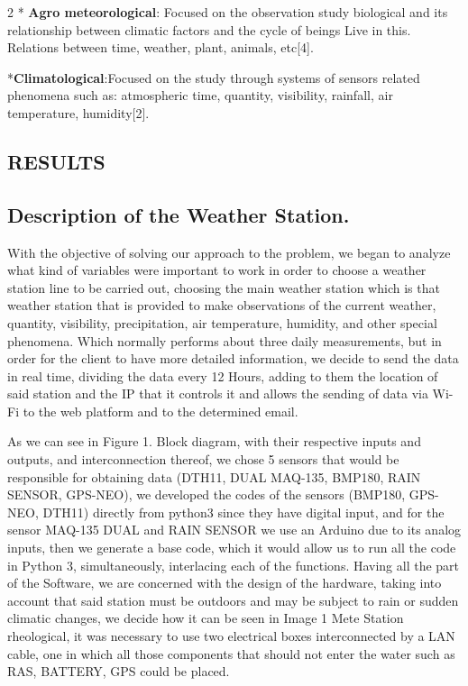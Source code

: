 \documentclass{article}
\begin{document}
\begin{multicols} {2}
* \textbf{Agro meteorological}: Focused on the observation study
biological and its relationship between climatic factors and the cycle of beings Live in this. Relations between time, weather, plant, animals, etc[4].

*\textbf{Climatological}:Focused on the study through systems of
sensors related phenomena such as: atmospheric time, quantity,
visibility, rainfall, air temperature, humidity[2].


\begin{center}
\section{RESULTS} 
\end{center}
\subsection{Description of the Weather Station.}

With the objective of solving our approach to the problem, we began to analyze what kind of variables were important to work in order to choose a weather station line to be carried out, choosing the main weather station which is that weather station that is provided to make observations of the current weather, quantity, visibility, precipitation, air temperature, humidity, and other special phenomena. Which normally performs about three daily measurements, but in order for the client to have more detailed information, we decide to send the data in real time, dividing the data every 12 Hours, adding to them the location of said station and the IP that it controls it and allows the sending of data via Wi-Fi to the web platform and to the determined email.

As we can see in Figure 1. Block diagram, with their respective inputs and outputs, and interconnection thereof, we chose 5 sensors that would be responsible for obtaining data (DTH11, DUAL MAQ-135, BMP180, RAIN SENSOR, GPS-NEO), we developed the codes of the sensors (BMP180, GPS-NEO, DTH11) directly from python3 since they have digital input, and for the sensor MAQ-135 DUAL and RAIN SENSOR we use an Arduino due to its analog inputs, then we generate a base code, which it would allow us to run all the code in Python 3, simultaneously, interlacing each of the functions. Having all the part of the Software, we are concerned with the design of the hardware, taking into account that said station must be outdoors and may be subject to rain or sudden climatic changes, we decide how it can be seen in Image 1 Mete Station rheological, it was necessary to use two electrical boxes interconnected by a LAN cable, one in which all those components that should not enter the water such as RAS, BATTERY, GPS could be placed.


\end{multicols}
\end{document}
